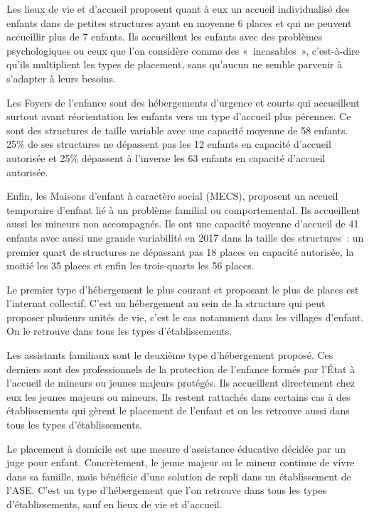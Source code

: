 \documentclass[
  12,
  a4paper,
]{report}
\begin{document}
Les lieux de vie et d'accueil proposent quant à eux un accueil
individualisé des enfants dans de petites structures ayant en moyenne 6
places et qui ne peuvent accueillir plus de 7 enfants. Ils accueillent
les enfants avec des problèmes psychologiques ou ceux que l'on considère
comme des «~incasables~», c'est-à-dire qu'ils multiplient les types de
placement, sans qu'aucun ne semble parvenir à s'adapter à leurs besoins.

Les Foyers de l'enfance sont des hébergements d'urgence et courts qui
accueillent surtout avant réorientation les enfants vers un type
d'accueil plus pérennes. Ce sont des structures de taille variable avec
une capacité moyenne de 58 enfants. 25\% de ses structures ne dépassent
pas les 12 enfants en capacité d'accueil autorisée et 25\% dépassent à
l'inverse les 63 enfants en capacité d'accueil autorisée.

Enfin, les Maisons d'enfant à caractère social (MECS), proposent un
accueil temporaire d'enfant lié à un problème familial ou
comportemental. Ils accueillent aussi les mineurs non accompagnés. Ils
ont une capacité moyenne d'accueil de 41 enfants avec aussi une grande
variabilité en 2017 dans la taille des structures~: un premier quart de
structures ne dépassant pas 18 places en capacité autorisée, la moitié
les 35 places et enfin les trois-quarts les 56 places.

Le premier type d'hébergement le plus courant et proposant le plus de
places est l'internat collectif. C'est un hébergement au sein de la
structure qui peut proposer plusieurs unités de vie, c'est le cas
notamment dans les villages d'enfant. On le retrouve dans tous les types
d'établissements.

Les assistants familiaux sont le deuxième type d'hébergement proposé.
Ces derniers sont des professionnels de la protection de l'enfance
formés par l'État à l'accueil de mineurs ou jeunes majeurs protégés. Ils
accueillent directement chez eux les jeunes majeurs ou mineurs. Ils
restent rattachés dans certains cas à des établissements qui gèrent le
placement de l'enfant et on les retrouve aussi dans tous les types
d'établissements.

Le placement à domicile est une mesure d'assistance éducative décidée
par un juge pour enfant. Concrètement, le jeune majeur ou le mineur
continue de vivre dans sa famille, mais bénéficie d'une solution de
repli dans un établissement de l'ASE. C'est un type d'hébergement que
l'on retrouve dans tous les types d'établissements, sauf en lieux de vie
et d'accueil.
\end{document}

